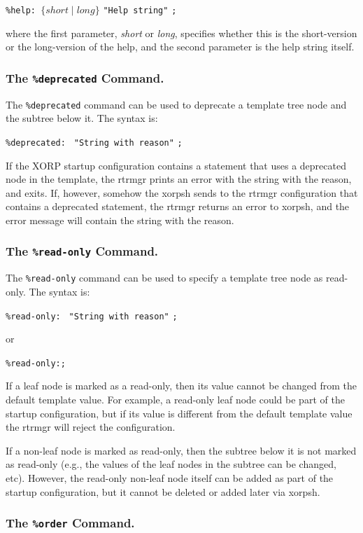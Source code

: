 \documentclass[11pt]{article}
\begin{document}
\texttt{\%help: }{$\{short \mid long\}$} \texttt{"Help string"} \texttt{;}

\noindent where the first parameter, \textit{short} or \textit{long},
specifies whether this is the short-version or the long-version of the
help, and the second parameter is the help string itself.

\subsubsection{The {\tt \%deprecated} Command.}

The {\tt \%deprecated} command can be used to deprecate a template tree
node and the subtree below it.
The syntax is:

\texttt{\%deprecated: } \texttt{"String with reason"} \texttt{;}

If the XORP startup configuration contains a statement that uses a
deprecated node in the template, the rtrmgr prints an error with
the string with the reason, and exits.
If, however, somehow the xorpsh sends to the rtrmgr configuration
that contains a deprecated statement, the rtrmgr returns an error to xorpsh,
and the error message will contain the string with the reason.

\subsubsection{The {\tt \%read-only} Command.}

The {\tt \%read-only} command can be used to specify a template tree
node as read-only.
The syntax is:

\texttt{\%read-only: } \texttt{"String with reason"} \texttt{;}

or

\texttt{\%read-only:;}

If a leaf node is marked as a read-only, then its value cannot be
changed from the default template value. For example, a read-only
leaf node could be part of the startup configuration, but if its
value is different from the default template value the rtrmgr
will reject the configuration.

If a non-leaf node is marked as read-only, then the subtree below
it is not marked as read-only (e.g., the values of the leaf nodes
in the subtree can be changed, etc). However, the read-only
non-leaf node itself can be added as part of the startup configuration,
but it cannot be deleted or added later via xorpsh.

\subsubsection{The {\tt \%order} Command.}
\end{document}
